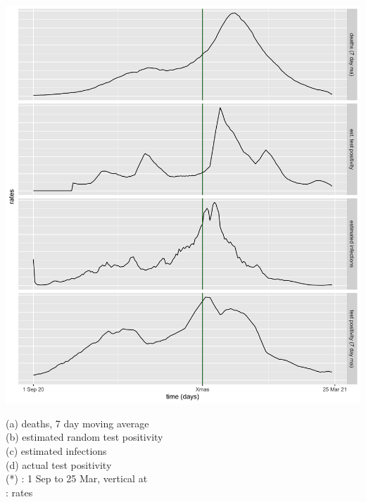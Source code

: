 \documentclass[9pt]{report}
\begin{document}
\includegraphics[height=0.9\textheight]{img/deaths-predict.png}
\quad 
\begin{minipage}[t]{1.5in}
  \vspace*{-2.2in}\footnotesize 
  (a) deaths, 7 day moving average 
  \\[18pt]
  (b) estimated random test positivity 
  \\[18pt]
  (c) estimated infections 
  \\[30pt]
  (d) actual test positivity 
  \\[8pt]
  \footnotesize (*) : 1 Sep to 25 Mar, vertical at 
  \\ : rates
\end{minipage}

\end{document}
